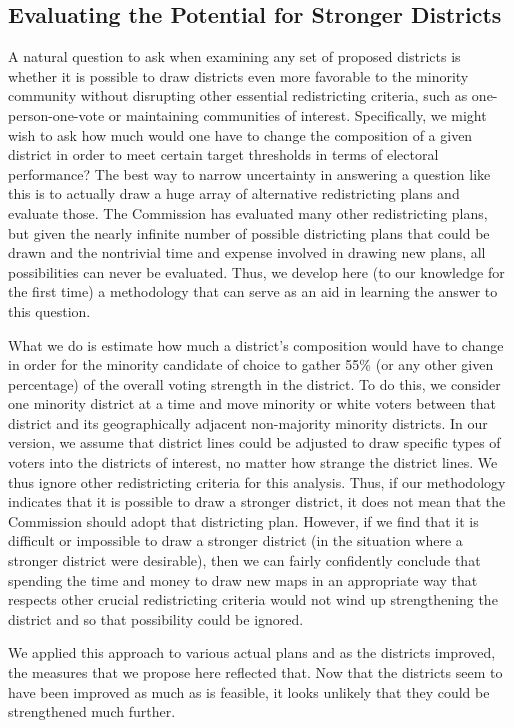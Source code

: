 \documentclass[12pt]{article}
\begin{document}
\subsection{Evaluating the Potential for Stronger Districts}

A natural question to ask when examining any set of proposed districts
is whether it is possible to draw districts even more favorable to the
minority community without disrupting other essential redistricting
criteria, such as one-person-one-vote or maintaining communities of
interest. Specifically, we might wish to ask how much would one have
to change the composition of a given district in order to meet certain
target thresholds in terms of electoral performance?  The best way to
narrow uncertainty in answering a question like this is to actually
draw a huge array of alternative redistricting plans and evaluate
those.  The Commission has evaluated many other redistricting plans,
but given the nearly infinite number of possible districting plans
that could be drawn and the nontrivial time and expense involved in
drawing new plans, all possibilities can never be evaluated.  Thus, we
develop here (to our knowledge for the first time) a methodology that
can serve as an aid in learning the answer to this question.

What we do is estimate how much a district's composition would have to
change in order for the minority candidate of choice to gather 55\%
(or any other given percentage) of the overall voting strength in the
district.  To do this, we consider one minority district at a time and
move minority or white voters between that district and its
geographically adjacent non-majority minority districts.  In our
version, we assume that district lines could be adjusted to draw
specific types of voters into the districts of interest, no matter how
strange the district lines.  We thus ignore other redistricting
criteria for this analysis.  Thus, if our methodology indicates that
it is possible to draw a stronger district, it does not mean that the
Commission should adopt that districting plan.  However, if we find
that it is difficult or impossible to draw a stronger district (in the
situation where a stronger district were desirable), then we can
fairly confidently conclude that spending the time and money to draw
new maps in an appropriate way that respects other crucial
redistricting criteria would not wind up strengthening the district
and so that possibility could be ignored.

We applied this approach to various actual plans and as the districts
improved, the measures that we propose here reflected that.  Now that
the districts seem to have been improved as much as is feasible, it
looks unlikely that they could be strengthened much further.
\end{document}
